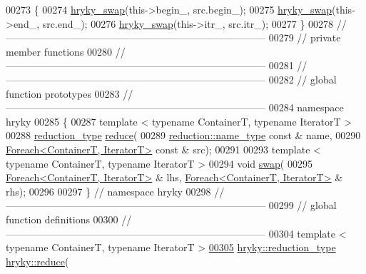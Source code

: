 \begin{DoxyCode}
00273 \{
00274     \hyperlink{namespacehryky_add9c1c1fdfda07cd47bcb7c16d3a823a}{hryky_swap}(this->begin\_, src.begin\_);
00275     \hyperlink{namespacehryky_add9c1c1fdfda07cd47bcb7c16d3a823a}{hryky_swap}(this->end\_, src.end\_);
00276     \hyperlink{namespacehryky_add9c1c1fdfda07cd47bcb7c16d3a823a}{hryky_swap}(this->itr\_, src.itr\_);
00277 \}
00278 \textcolor{comment}{//
      ------------------------------------------------------------------------------}
00279 \textcolor{comment}{// private member functions}
00280 \textcolor{comment}{//
      ------------------------------------------------------------------------------}
00281 \textcolor{comment}{//
      ------------------------------------------------------------------------------}
00282 \textcolor{comment}{// global function prototypes}
00283 \textcolor{comment}{//
      ------------------------------------------------------------------------------}
00284 \textcolor{keyword}{namespace }hryky
00285 \{
00287     \textcolor{keyword}{template} < \textcolor{keyword}{typename} ContainerT, \textcolor{keyword}{typename} IteratorT >
00288     \hyperlink{classhryky_1_1_intrusive_ptr}{reduction_type} \hyperlink{namespacehryky_af41cb3af6766761da0ff21b84527a52c}{reduce}(
00289         \hyperlink{classhryky_1_1reduction_1_1_string}{reduction::name_type} \textcolor{keyword}{const} & name,
00290         \hyperlink{classhryky_1_1_foreach}{Foreach<ContainerT, IteratorT>} \textcolor{keyword}{const} & src);
00291 
00293     \textcolor{keyword}{template} < \textcolor{keyword}{typename} ContainerT, \textcolor{keyword}{typename} IteratorT >
00294     \textcolor{keywordtype}{void} \hyperlink{namespacehryky_a4282146df5ea2b68cb667896a2205909}{swap}(
00295         \hyperlink{classhryky_1_1_foreach}{Foreach<ContainerT, IteratorT>} & lhs, \hyperlink{classhryky_1_1_foreach}{Foreach<ContainerT, IteratorT>} & 
      rhs);
00296 
00297 \} \textcolor{comment}{// namespace hryky}
00298 \textcolor{comment}{//
      ------------------------------------------------------------------------------}
00299 \textcolor{comment}{// global function definitions}
00300 \textcolor{comment}{//
      ------------------------------------------------------------------------------}
00304 \textcolor{comment}{}\textcolor{keyword}{template} < \textcolor{keyword}{typename} ContainerT, \textcolor{keyword}{typename} IteratorT >
\hypertarget{foreach_8h_source_l00305}{}\hyperlink{namespacehryky_a1ed5921c3b79b513b658b10f5a963c50}{00305} \hyperlink{classhryky_1_1_intrusive_ptr}{hryky::reduction_type} \hyperlink{namespacehryky_af41cb3af6766761da0ff21b84527a52c}{hryky::reduce}(

\end{DoxyCode}
